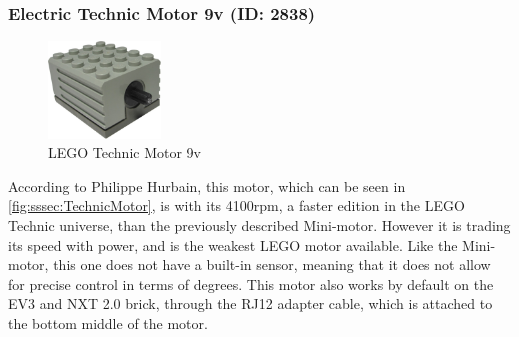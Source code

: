 \subsubsection{Electric Technic Motor 9v (ID: 2838)}
\begin{figure}[H]
  \centering
  \includegraphics[width=3cm]{images/techAnalysis/LegoTechnicMotor.jpg}
  \caption{LEGO Technic Motor 9v \cite{BrickOWl-figure-Technic-Motor9v}}\label{fig:sssec:TechnicMotor}
\end{figure}
According to Philippe Hurbain, this motor, which can be seen in \autoref{fig:sssec:TechnicMotor}, is with its 4100rpm, a faster edition in the LEGO Technic universe, than the previously described Mini-motor.
However it is trading its speed with power, and is the weakest LEGO motor available.
Like the Mini-motor, this one does not have a built-in sensor, meaning that it does not allow for precise control in terms of degrees.
This motor also works by default on the EV3 and NXT 2.0 brick, through the RJ12 adapter cable, which is attached to the bottom middle of the motor.
\cite{hurbain_lego_technicmotorComp}
